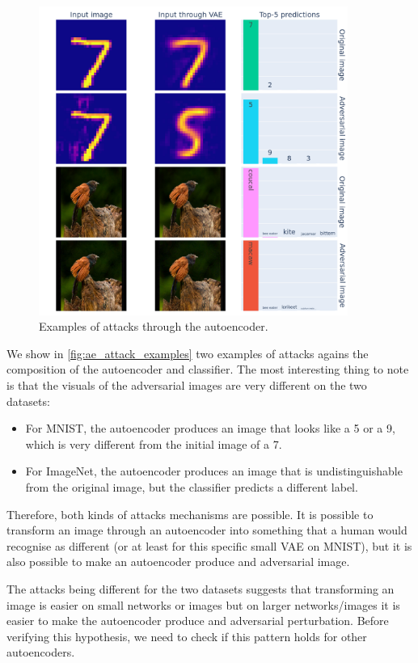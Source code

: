 \documentclass[]{scrarticle}
\begin{document}
\begin{figure}[h]
  \centering
  \includegraphics[width=0.9\textwidth]{images/ae_attack_examples.png}
  \caption{
    Examples of attacks through the autoencoder.
  }
  \label{fig:ae_attack_examples}
\end{figure}


We show in \autoref{fig:ae_attack_examples} two examples of attacks
agains the composition of the autoencoder and classifier.
The most interesting thing to note is that the visuals of the
adversarial images are very different on the two datasets:
\begin{itemize}
  \item For MNIST, the autoencoder produces an image that looks like
    a 5 or a 9, which is very different from the initial image of a 7.
  \item For ImageNet, the autoencoder produces an image that is undistinguishable
    from the original image, but the classifier predicts a different label.
\end{itemize}

Therefore, both kinds of attacks mechanisms are possible. It is possible to transform an image through an autoencoder
into something that a human would recognise as different
(or at least for this specific small VAE on MNIST), but it is also possible
to make an autoencoder produce and adversarial image.

The attacks being different for the two datasets suggests that
transforming an image is easier on small networks or images
but on larger networks/images it is easier to make the autoencoder
produce and adversarial perturbation.
Before verifying this hypothesis,
we need to check if this pattern holds for other autoencoders.
\end{document}
